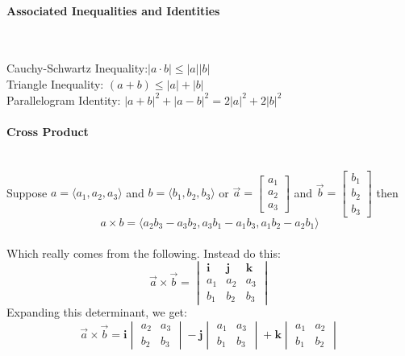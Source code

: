 \documentclass{article}
\begin{document}
\paragraph{Associated Inequalities and Identities}\mbox{}\\
\begin{doublespace}
Cauchy-Schwartz Inequality:\hspace{1cm}\(|a \cdot b| \leq |a||b|\)\\
Triangle Inequality: \hspace{1cm}\((a + b) \leq |a| + |b|\)\\
Parallelogram Identity: \hspace{1cm} \(|a+b|^2 + |a-b|^2 = 2|a|^2 +  2|b|^2\)
\end{doublespace}

\paragraph{Cross Product}\mbox{}\\
Suppose \(a = \langle a_1, a_2, a_3 \rangle\) and \(b = \langle b_1, b_2, b_3 \rangle\) 
or \( \vec{a} = \begin{bmatrix} a_1 \\ a_2 \\ a_3 \end{bmatrix} \) and \( \vec{b} = \begin{bmatrix} b_1 \\ b_2 \\ b_3 \end{bmatrix} \)
then\\
\begin{equation}
    \label{corss product}
    a \times b = \langle a_2b_3 - a_3b_2, a_3b_1 - a_1b_3, a_1b_2 - a_2b_1 \rangle
\end{equation}\\
Which really comes from the following. Instead do this:\\
\[ 
\vec{a} \times \vec{b} = 
\begin{vmatrix}
\mathbf{i} & \mathbf{j} & \mathbf{k} \\
a_1 & a_2 & a_3 \\
b_1 & b_2 & b_3
\end{vmatrix} 
\]
Expanding this determinant, we get:
\[ 
\vec{a} \times \vec{b} = \mathbf{i}
\begin{vmatrix}
a_2 & a_3 \\
b_2 & b_3 
\end{vmatrix}
- \mathbf{j}
\begin{vmatrix}
a_1 & a_3 \\
b_1 & b_3
\end{vmatrix}
+ \mathbf{k}
\begin{vmatrix}
a_1 & a_2 \\
b_1 & b_2
\end{vmatrix}
\]
\end{document}
